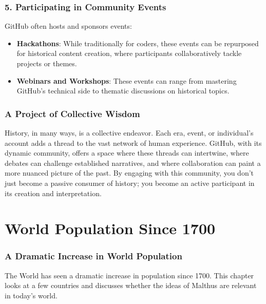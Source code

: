 \documentclass[a4paper,12pt]{book}
\begin{document}
\subsection*{5. Participating in Community Events}
GitHub often hosts and sponsors events:

\begin{itemize}
    \item \textbf{Hackathons}: While traditionally for coders, these events can be repurposed for historical content creation, where participants collaboratively tackle projects or themes.
    \item \textbf{Webinars and Workshops}: These events can range from mastering GitHub's technical side to thematic discussions on historical topics.
\end{itemize}

\subsection*{A Project of Collective Wisdom}
History, in many ways, is a collective endeavor. Each era, event, or individual's account adds a thread to the vast network of human experience. GitHub, with its dynamic community, offers a space where these threads can intertwine, where debates can challenge established narratives, and where collaboration can paint a more nuanced picture of the past. By engaging with this community, you don't just become a passive consumer of history; you become an active participant in its creation and interpretation.

\chapter{World Population Since 1700}
\subsection*{A Dramatic Increase in World Population}
The World has seen a dramatic increase in population since 1700. This chapter looks at a few countries and discusses whether the ideas of Malthus are relevant in today's world.

\let\oldsection\section
\renewcommand{\section}[1]{\oldsection*{#1}\addcontentsline{toc}{section}{#1}}
\end{document}
